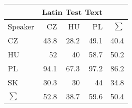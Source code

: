 \begin{tabular}{l|rrr|r}
\hline
 & \multicolumn{3}{c}{Latin Test Text} & \\
\hline
 Speaker   &   CZ &   HU &   PL &   $\sum$ \\
\hline
 CZ        & 43.8 & 28.2 & 49.1 &     40.4 \\
 HU        & 52   & 40   & 58.7 &     50.2 \\
 PL        & 94.1 & 67.3 & 97.2 &     86.2 \\
 SK        & 30.3 & 30   & 44   &     34.8 \\
\hline
 $\sum$   & 52.8 & 38.7 & 59.6 &     50.4 \\
\hline
\end{tabular}